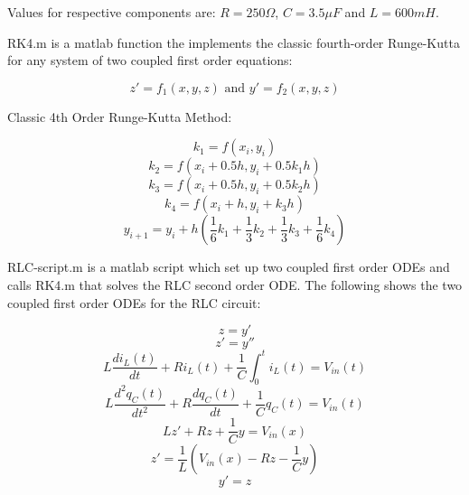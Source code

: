 \documentclass[11pt, oneside, titlepage]{article}   	%
\begin{document}
Values for respective components are: $R = 250\Omega$, $C = 3.5 \mu F$ and $L = 600 mH$.

RK4.m is a matlab function the implements the classic fourth-order Runge-Kutta for any system of two coupled first order equations:

\begin{equation}
z'=f_1(x,y,z) \text{ and } y'=f_2(x,y,z)
\end{equation}

Classic 4th Order Runge-Kutta Method:

\begin{equation}
k_1=f(x_i,y_i)
\end{equation}
\begin{equation}
k_2=f(x_i+0.5h,y_i+0.5k_1h)
\end{equation}
\begin{equation}
k_3=f(x_i+0.5h,y_i+0.5k_2h)
\end{equation}
\begin{equation}
k_4=f(x_i+h,y_i+k_3h)
\end{equation}
\begin{equation}
y_{i+1}=y_i+h(\frac{1}{6}k_1+\frac{1}{3}k_2+\frac{1}{3}k_3+\frac{1}{6}k_4)
\end{equation}

RLC-script.m is a matlab script which set up two coupled first order ODEs and calls RK4.m that solves the RLC second order ODE. The following shows the two coupled first order ODEs for the RLC circuit:

\begin{equation}z=y'\end{equation}
\begin{equation}z'=y''\end{equation}
\begin{equation}L\frac{di_L(t)}{dt}+Ri_L(t)+\frac{1}{C}\int_0^t{i_L(t)}=V_{in}(t)\end{equation}
\begin{equation}L\frac{d^2q_C(t)}{dt^2}+R\frac{dq_C(t)}{dt}+\frac{1}{C}q_C(t)=V_{in}(t)\end{equation}
\begin{equation}Lz'+Rz+\frac{1}{C}y=V_{in}(x)\end{equation}
\begin{equation}z'=\frac{1}{L}(V_{in}(x)-Rz-\frac{1}{C}y)\end{equation}
\begin{equation}y'=z\end{equation}
\end{document}
